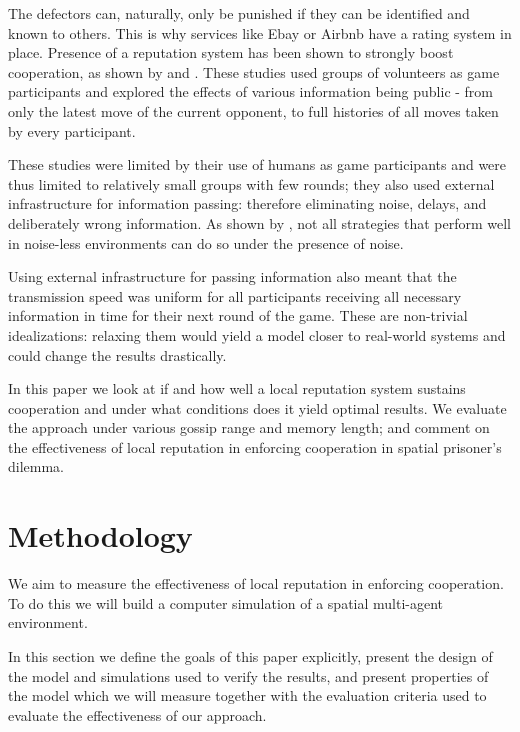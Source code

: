\documentclass[english]{article}
\begin{document}
The defectors can, naturally, only be punished if they can be identified and known to others. This is why services like Ebay or Airbnb have a rating system in place.
Presence of a reputation system has been shown to strongly boost cooperation, as shown by \citet{simple-reputation} and \citet{public-private-monitoring}.
These studies used groups of volunteers as game participants and explored the effects of various information being public - from only the latest move of the current opponent, to full histories of all moves taken by every participant.

These studies were limited by their use of humans as game participants and were thus limited to relatively small groups with few rounds; they also used external infrastructure for information passing: therefore eliminating noise, delays, and deliberately wrong information.
As shown by \citet{noise}, not all strategies that perform well in noise-less environments can do so under the presence of noise.

Using external infrastructure for passing information also meant that the transmission speed was uniform for all participants receiving all necessary information in time for their next round of the game.
These are non-trivial idealizations: relaxing them would yield a model closer to real-world systems and could change the results drastically.

In this paper we look at if and how well a local reputation system sustains cooperation and under what conditions does it yield optimal results.
We evaluate the approach under various gossip range and memory length; and comment on the effectiveness of local reputation in enforcing cooperation in spatial prisoner's dilemma.



\section{Methodology}
We aim to measure the effectiveness of local reputation in enforcing cooperation. To do this we will build a computer simulation of a spatial multi-agent environment.

In this section we define the goals of this paper explicitly, present the design of the model and simulations used to verify the results, and present properties of the model which we will measure together with the evaluation criteria used to evaluate the effectiveness of our approach.
\end{document}

